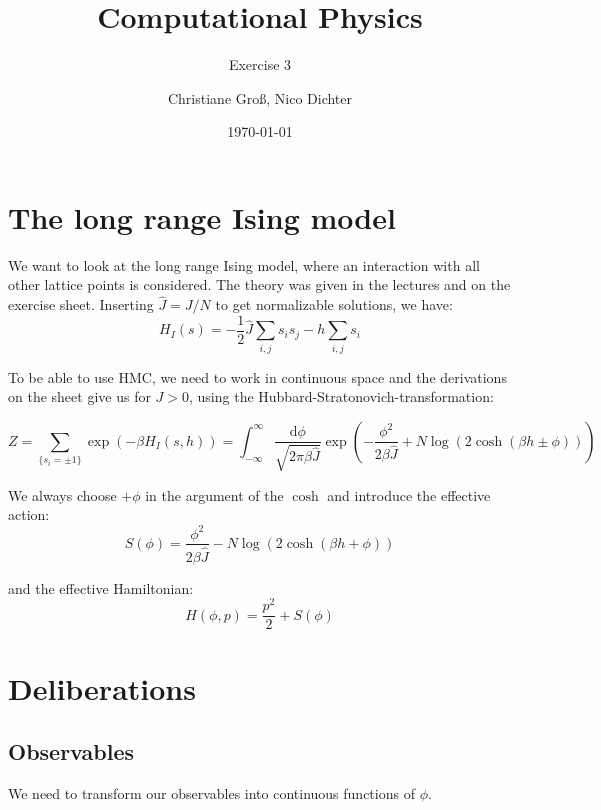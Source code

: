 \documentclass{scrartcl}
\title{Computational Physics}
\subtitle{Exercise 3}
\date{\today}
\author{Christiane Groß, Nico Dichter}
\begin{document}
	\maketitle
\section{The long range Ising model}
We want to look at the long range Ising model, where an interaction with all other lattice points is considered. The theory was given in the lectures and on the exercise sheet. Inserting $\hat{J}=J/N$ to get normalizable solutions, we have: 
\begin{equation}
H_I(s)=-\frac{1}{2}\hat{J}\sum_{i,j}s_is_j-h\sum_{i,j}s_i
\label{eq:hamiltonianising}
\end{equation}

To be able to use HMC, we need to work in continuous space and the derivations on the sheet give us for $J>0$, using the Hubbard-Stratonovich-transformation:

\begin{equation}
Z=\sum_{\{s_i=\pm1\}}\exp(-\beta H_I(s,h))=
\int_{-\infty}^{\infty}\frac{\mathrm{d} \phi}{\sqrt{2\pi\beta\hat{J}}}
\exp\left( -\frac{\phi^2}{2\beta\hat{J}}+N\log\left( 2\cosh(\beta h\pm\phi)\right) \right) 
\label{eq:partfunc}
\end{equation}


We always choose $+\phi$ in the argument of the $\cosh$ and introduce the effective action:
\begin{equation}
S(\phi)=\frac{\phi^2}{2\beta\hat{J}}-N\log\left( 2\cosh(\beta h+\phi)\right)
\end{equation}

and the effective Hamiltonian:
\begin{equation}
H(\phi, p)=\frac{p^2}{2}+S(\phi)
\end{equation}

\section{Deliberations}

\subsection{Observables}
We need to transform our observables into continuous functions of $\phi$.
\end{document}
